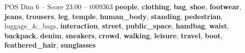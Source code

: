 \begin{textsample}{POS Dim 6 – Score 23.00 – t009363}  \label{ex:f6_pos_001}
\textbf{people}, \textbf{clothing}, \textbf{bag}, \textbf{shoe}, \textbf{footwear}, \textbf{jeans}, \textbf{trousers}, \textbf{leg}, \textbf{temple}, \textbf{human\_body}, \textbf{standing}, \textbf{pedestrian}, luggage\_\&\_bags, \textbf{interaction}, \textbf{street}, \textbf{public\_space}, \textbf{handbag}, \textbf{waist}, \textbf{backpack}, \textbf{denim}, \textbf{sneakers}, \textbf{crowd}, \textbf{walking}, \textbf{leisure}, \textbf{travel}, \textbf{boot}, \textbf{feathered\_hair}, \textbf{sunglasses}

\end{textsample}
